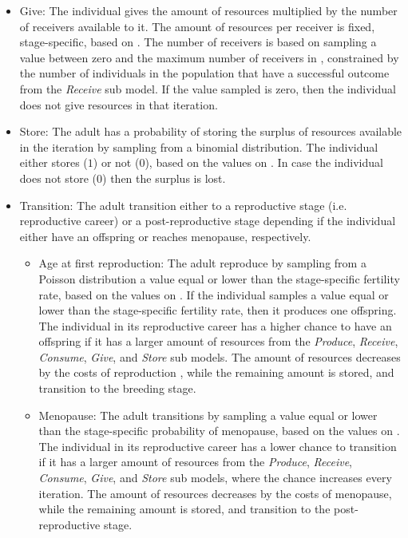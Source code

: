\documentclass{article}
\begin{document}
\begin{itemize}
\begin{itemize}
        \item Give: The individual gives the amount of resources multiplied by the number of receivers available to it. The amount of resources per receiver is fixed, stage-specific, based on \cite{gurven2004give}. The number of receivers is based on sampling a value between zero and the maximum number of receivers in \cite{gurven2004give}, constrained by the number of individuals in the population that have a successful outcome from the \emph{Receive} sub model. If the value sampled is zero, then the individual does not give resources in that iteration.
        \item Store: The adult has a probability of storing the surplus of resources available in the iteration by sampling from a binomial distribution. The individual either stores ($1$) or not ($0$), based on the values on \citep{bowles2011cultivation}. In case the individual does not store ($0$) then the surplus is lost.
        \item Transition: The adult transition either to a reproductive stage (i.e. reproductive career) or a post-reproductive stage depending if the individual either have an offspring or reaches menopause, respectively.
        \begin{itemize}
            \item Age at first reproduction: The adult reproduce by sampling from a Poisson distribution a value equal or lower than the stage-specific fertility rate, based on the values on \citep{wood2017dynamics}. If the individual samples a value equal or lower than the stage-specific fertility rate, then it produces one offspring. The individual in its reproductive career has a higher chance to have an offspring if it has a larger amount of resources from the \emph{Produce}, \emph{Receive}, \emph{Consume}, \emph{Give}, and \emph{Store} sub models. The amount of resources decreases by the costs of reproduction \citep{wood2017dynamics}, while the remaining amount is stored, and transition to the breeding stage.
            \item Menopause: The adult transitions by sampling a value equal or lower than the stage-specific probability of menopause, based on the values on \citep{laisk2019demographic}. The individual in its reproductive career has a lower chance to transition if it has a larger amount of resources from the \emph{Produce}, \emph{Receive}, \emph{Consume}, \emph{Give}, and \emph{Store} sub models, where the chance increases every iteration. The amount of resources decreases by the costs of menopause, while the remaining amount is stored, and transition to the post-reproductive stage.

\end{itemize}
\end{itemize}
\end{itemize}
\end{document}
